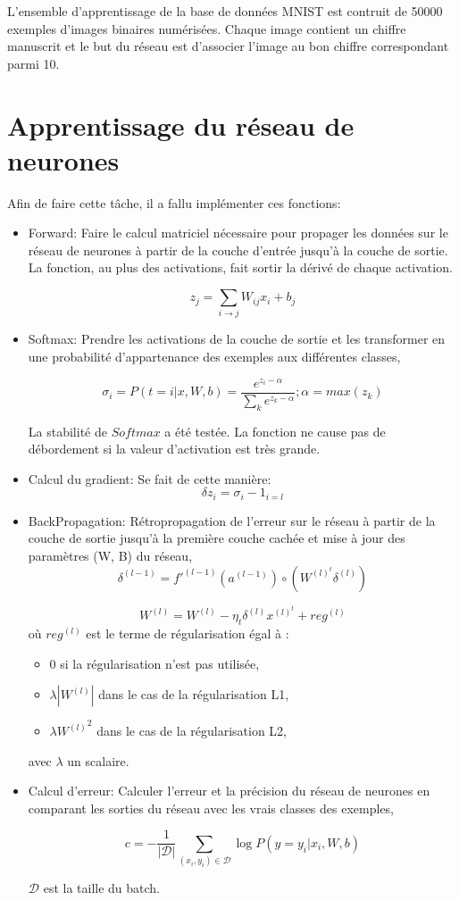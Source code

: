 \documentclass[a4paper,english,12pt]{article}
\begin{document}
L'ensemble d'apprentissage de la base de données MNIST est contruit de 50000 exemples d'images binaires numérisées. Chaque image contient un chiffre manuscrit et le but du réseau est d'associer l'image au bon chiffre correspondant parmi 10. 

\section{Apprentissage du réseau de neurones}
Afin de faire cette tâche, il a fallu implémenter ces fonctions:
\begin{itemize}
	\item Forward: Faire le calcul matriciel nécessaire pour propager les données sur le réseau de neurones à partir de la couche d'entrée jusqu'à la couche de sortie. La fonction, au plus des activations, fait sortir la dérivé de chaque activation.
	
	$$z_j = \sum_{i \rightarrow j} W_{ij} x_i + b_j$$
	
	\item Softmax: Prendre les activations de la couche de sortie et les transformer en une probabilité d'appartenance des exemples aux différentes classes,
	
	$$ \sigma_i = P(t=i|x,W,b) = \frac{e^{z_i-\alpha}}{\sum_k e^{z_k-\alpha}} ; \alpha=max(z_k)$$
	
	La stabilité de $Softmax$ a été testée. La fonction ne cause pas de débordement si la valeur d'activation est très grande.
	
	\item Calcul du gradient: Se fait de cette manière:	
		$$\delta z_i = \sigma_i - 1_{i=l}$$	
		
	\item BackPropagation: Rétropropagation de l'erreur sur le réseau à partir de la couche de sortie jusqu'à la première couche cachée et mise à jour des paramètres (W, B) du réseau,
		$$\delta^{(l-1)}=f'^{(l-1)}(a^{(l-1)}) \circ (W^{(l)^t}\delta^{(l)})$$
		
		$$W^{(l)}=W^{(l)}-\eta_t \delta^{(l)} x^{(l)^t}+reg^{(l)}$$
		où $reg^{(l)}$ est le terme de régularisation égal à :
		\begin{itemize}
			\item $0$ si la régularisation n'est pas utilisée,
			\item $\lambda|W^{(l)}|$ dans le cas de la régularisation L1,
			\item $\lambda{W^{(l)}}^2$ dans le cas de la régularisation L2,
		\end{itemize}
		avec $\lambda$ un scalaire.
	\item Calcul d'erreur: Calculer l'erreur et la précision du réseau de neurones en comparant les sorties du réseau avec les vrais classes des exemples,
	
	$$c = - \frac{1}{|\mathcal{D}|}\sum_{(x_{i}, y_{i}) \in \mathcal{D}} \log P(y=y_{i}|x_{i},W,b)$$
	
	
	$\mathcal{D}$ est la taille du batch.
\end{itemize}
\end{document}

